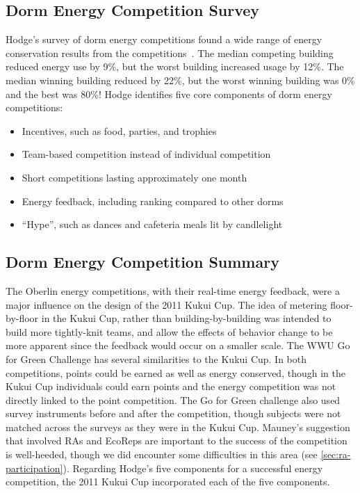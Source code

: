 \subsection{Dorm Energy Competition Survey}

Hodge's survey of dorm energy competitions found a wide range of energy conservation results from the competitions~\cite{Hodge2010}. The median competing building reduced energy use by 9\%, but the worst building increased usage by 12\%. The median winning building reduced by 22\%, but the worst winning building was 0\% and the best was 80\%! Hodge identifies five core components of dorm energy competitions:

\begin{itemize}
	\item Incentives, such as food, parties, and trophies
	\item Team-based competition instead of individual competition
	\item Short competitions lasting approximately one month
	\item Energy feedback, including ranking compared to other dorms
	\item ``Hype'', such as dances and cafeteria meals lit by candlelight
\end{itemize}


\subsection{Dorm Energy Competition Summary}

The Oberlin energy competitions, with their real-time energy feedback, were a major influence on the design of the 2011 Kukui Cup. The idea of metering floor-by-floor in the Kukui Cup, rather than building-by-building was intended to build more tightly-knit teams, and allow the effects of behavior change to be more apparent since the feedback would occur on a smaller scale. The WWU Go for Green Challenge has several similarities to the Kukui Cup. In both competitions, points could be earned as well as energy conserved, though in the Kukui Cup individuals could earn points and the energy competition was not directly linked to the point competition. The Go for Green challenge also used survey instruments before and after the competition, though subjects were not matched across the surveys as they were in the Kukui Cup. Mauney's suggestion that involved RAs and EcoReps are important to the success of the competition is well-heeded, though we did encounter some difficulties in this area (see \autoref{sec:ra-participation}). Regarding Hodge's five components for a successful energy competition, the 2011 Kukui Cup incorporated each of the five components.


